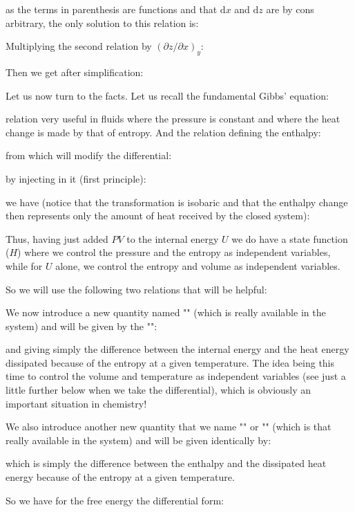 	as the terms in parenthesis are functions and that $\mathrm{d}x$ and $\mathrm{d}z$ are by cons arbitrary, the only solution to this relation is:
	
	Multiplying the second relation by $(\partial z/\partial x)_y$:
	
	Then we get after simplification:
	
	Let us now turn to the facts. Let us recall the fundamental Gibbs' equation:
	
	relation very useful in fluids where the pressure is constant and where the heat change is made by that of entropy. And the relation defining the enthalpy:
	
	from which will modify the differential:
	
	by injecting in it (first principle):
	
	we have (notice that the transformation is isobaric and that the enthalpy change then represents only the amount of heat received by the closed system):
	
	Thus, having just added $PV$ to the internal energy $U$ we do have a state function ($H$) where we control the pressure and the entropy as independent variables, while for $U$ alone, we control the entropy and volume as independent variables.

	So we will use the following two relations that will be helpful:
	
	We now introduce a new quantity named "" (which is really available in the system) and will be given by the "":
	
	and giving simply the difference between the internal energy and the heat energy dissipated because of the entropy at a given temperature. The idea being this time to control the volume and temperature as independent variables (see just a little further below when we take the differential), which is obviously an important situation in chemistry!

	We also introduce another new quantity that we name "" or "" (which is that really available in the system) and will be given identically by:
	
	which is simply the difference between the enthalpy and the dissipated heat energy because of the entropy at a given temperature.

	So we have for the free energy the differential form:
	
